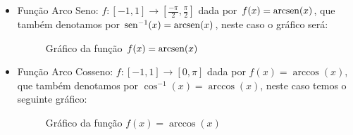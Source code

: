 \begin{itemize}
  Lembramos que $\cotan(x)= \dfrac{\cos(x)}{\sen(x)}$ logo o domínio da função cotangente é o conjunto dos $x \in \R$ tais que $\sen(x) \neq 0$.

  Já no gráfico da função cotangente vemos a repetição do comportamento do intervalo $]0, \pi[$, e temos que
  \[\cotan(x + \pi)= \cotan(x)\]
  portanto esta é uma função periódica de período $\pi$.

  \textbf{Funções Inversas}

  As funções trigonométricas admitem inversas quando restringimos seus domínios a um único período da função, assim temos por exemplo as seguintes funções:

  \item Função Arco Seno: $f: [-1, 1] \rightarrow [\frac{-\pi}{2}, \frac{\pi}{2}]$ dada por $f(x)= \operatorname{arcsen}(x)$, que também denotamos por $\operatorname{sen}^{-1}(x)= \operatorname{arcsen}(x)$, neste caso o gráfico será:

  \begin{figure}[H]
  \centering
    \caption{Gráfico da função $f(x)= \operatorname{arcsen}(x)$}
  \end{figure}


  \item Função Arco Cosseno: $f: [-1, 1] \rightarrow [0, \pi]$ dada por $f(x)= \arccos(x)$, que também denotamos por $\cos^{-1}(x)= \arccos (x)$, neste caso temos o seguinte gráfico:

  \begin{figure}[H]
  \centering
    \caption{Gráfico da função $f(x)= \arccos(x)$}
  \end{figure}



\end{itemize}
